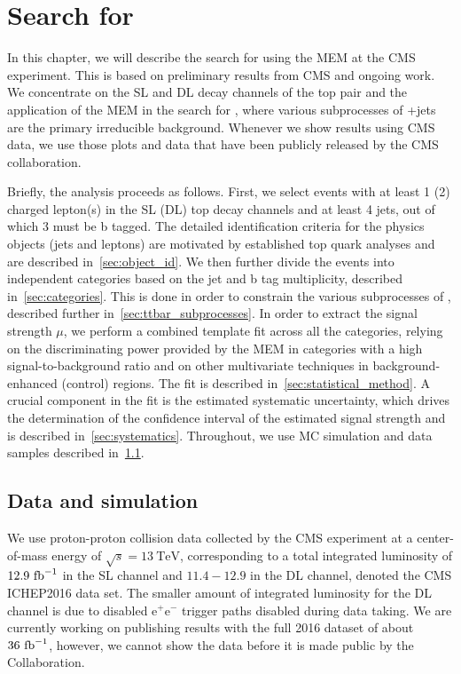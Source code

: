 \section{Search for \ttHbb}

In this chapter, we will describe the search for \ttHbb using the MEM at the CMS experiment. This is based on preliminary results from CMS\cite{CMS-PAS-HIG-16-038} and ongoing work. We concentrate on the SL and DL decay channels of the top pair and the application of the MEM in the search for \ttHbb, where various subprocesses of \ttbar+jets are the primary irreducible background. Whenever we show results using CMS data, we use those plots and data that have been publicly released by the CMS collaboration.

Briefly, the analysis proceeds as follows. First, we select events with at least 1 (2) charged lepton(s) in the SL (DL) top decay channels and at least 4 jets, out of which 3 must be b tagged. The detailed identification criteria for the physics objects (jets and leptons) are motivated by established top quark analyses and are described in~\cref{sec:object_id}. We then further divide the events into independent categories based on the jet and b tag multiplicity, described in~\cref{sec:categories}. This is done in order to constrain the various subprocesses of \ttbar, described further in~\cref{sec:ttbar_subprocesses}. In order to extract the signal strength $\mu$, we perform a combined template fit across all the categories, relying on the discriminating power provided by the MEM in categories with a high signal-to-background ratio and on other multivariate techniques in background-enhanced (control) regions. The fit is described in~\cref{sec:statistical_method}.
A crucial component in the fit is the estimated systematic uncertainty, which drives the determination of the confidence interval of the estimated signal strength and is described in~\cref{sec:systematics}. Throughout, we use MC simulation and data samples described in~\cref{sec:data_mc}.

\subsection{Data and simulation}
\label{sec:data_mc}

We use proton-proton collision data collected by the CMS experiment at a center-of-mass energy of $\sqrt{s} = 13~\mathrm{TeV}$, corresponding to a total integrated luminosity of $12.9~\mathrm{fb}^{-1}$ in the SL channel and $11.4-12.9$ in the DL channel, denoted the CMS ICHEP2016 data set. The smaller amount of integrated luminosity for the DL channel is due to disabled $\mathrm{e}^+\mathrm{e}^-$ trigger paths disabled during data taking. We are currently working on publishing results with the full 2016 dataset of about $36~\mathrm{fb}^{-1}$, however, we cannot show the data before it is made public by the Collaboration.

